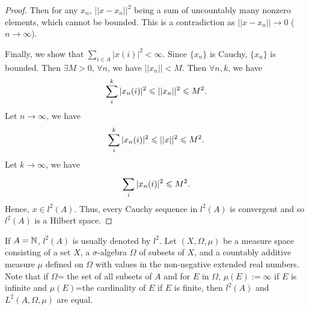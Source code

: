 \begin{proof}
    Then for any $x_n$, $||x-x_n||^2$ being a sum of uncountably many nonzero elements, which cannot be bounded. This is a contradiction as $||x-x_n||\rightarrow 0$ ($n\rightarrow \infty$).
    \par
    Finally, we show that $\sum\limits_{i\in A}^{}|x(i)|^2<\infty$. Since $\{x_n\}$ is Cauchy, $\{x_n\}$ is bounded. Then $\exists M>0$, $\forall n$, we have $||x_n||<M$. Then $\forall n,k$, we have
    \begin{align*}
        \sum\limits_{i}^{k}|x_n(i)|^2\leqslant ||x_n||^2\leqslant M^2.
    \end{align*}
    Let $n\rightarrow \infty$, we have
    \begin{align*}
        \sum\limits_{i}^{k}|x_n(i)|^2\leqslant ||x||^2\leqslant M^2.
    \end{align*}
    Let $k\rightarrow \infty$, we have
    \begin{align*}
        \sum\limits_{i}^{}|x_n(i)|^2\leqslant M^2.
    \end{align*}
    Hence, $x\in l^2(A)$.
    Thus, every Cauchy sequence in $l^2(A)$ is convergent and so $l^2(A)$ is a Hilbert space.
\end{proof}

If $A=\mathbb{N}$, $l^2(A)$ is usually denoted by $l^2$. Let $(X,\Omega, \mu)$ be a measure space consisting of a set $X$, a 
$\sigma$-algebra $\Omega$ of subsets of $X$, and a countably additive measure $\mu$ defined 
on $\Omega$ with values in the non-negative extended real numbers.
Note that if $\Omega$= the set of all subsets of $A$ and for $E$ in $\Omega$, $\mu(E):=\infty$ if $E$ is infinite and $\mu(E)$=the cardinality of $E$ if $E$ is finite, 
then $l^2(A)$ and $L^2(A,\Omega,\mu)$ are equal.






